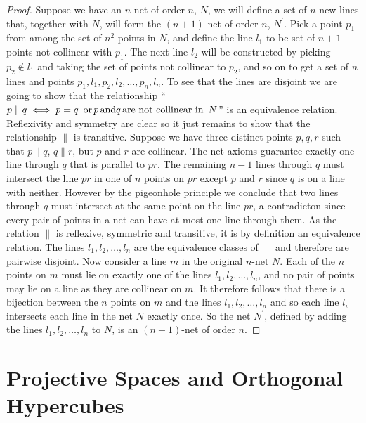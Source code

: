 \documentclass{article}
\begin{document}
\begin{proof}
  Suppose we have an \(n\)-net of order \(n\), \(N\), we will define a set of
\(n\) new lines that, together with \(N\), will form the \((n + 1)\)-net of order \(n\), \(N^{\prime}\).
Pick a point \(p_{1}\) from among the set of \(n^{2}\) points in \(N\), and
define the line \(l_{1}\) to be set of \(n + 1\) points not collinear with \(p_{1}\). The next line \(l_{2}\) will be constructed by picking
\(p_{2} \notin l_{1}\) and taking the set of points not collinear to \(p_{2}\), and
so on to get a set of \(n\) lines and points
\(p_{1}, l_{1}, p_{2}, l_{2}, \ldots, p_{n}, l_{n}\). To see that the lines are
disjoint we are going to show that the relationship ``\(p \parallel q \iff p = q \text{\,
or\,} p \text{\,and} q \text{\,are not collinear in \,} N\)'' is an equivalence relation.
Reflexivity and symmetry are clear so it just remains to show that the
relationship \(\parallel\) is transitive. Suppose we have three distinct points
\(p, q, r\) such that \(p \parallel q\), \(q \parallel r\), but \(p\) and \(r\) are collinear.
The net axioms guarantee exactly one line through \(q\) that is parallel to
\(pr\). The remaining \(n - 1\) lines through \(q\) must intersect the line
\(pr\) in one of \(n\) points on \(pr\) except \(p\) and \(r\) since \(q\) is on
a line with neither. However by the pigeonhole principle we conclude that two
lines through \(q\) must intersect at the same point on the line \(pr\), a
contradicton since every pair of points in a net can have at most one line
through them. As the relation \(\parallel\) is reflexive, symmetric and transitive, it
is by definition an equivalence relation. The lines \(l_{1}, l_{2}, \ldots, l_{n}\)
are the equivalence classes of \(\parallel\) and therefore are pairwise disjoint. Now
consider a line \(m\) in the original \(n\)-net \(N\). Each of the \(n\) points
on \(m\) must lie on exactly one of the lines \(l_{1}, l_{2}, \ldots, l_{n}\), and no
pair of points may lie on a line as they are collinear on \(m\). It therefore
follows that there is a bijection between the \(n\) points on \(m\) and the
lines \(l_{1}, l_{2}, \ldots, l_{n}\) and so each line \(l_{i}\) intersects each line
in the net \(N\) exactly once. So the net \(N^{\prime}\), defined by adding the lines
\(l_{1}, l_{2}, \ldots, l_{n}\) to \(N\), is an \((n + 1)\)-net of order \(n\).
\end{proof}
\section{Projective Spaces and Orthogonal Hypercubes}
\end{document}
